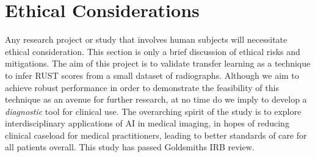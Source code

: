 




\section{Ethical Considerations}

Any research project or study that involves human subjects will necessitate ethical consideration. This section is only a brief discussion of ethical risks and mitigations. The aim of this project is to validate transfer learning as a technique to infer RUST scores from a small dataset of radiographs. Although we aim to achieve robust performance in order to demonstrate the feasibility of this technique as an avenue for further research, at no time do we imply to develop a \emph{diagnostic} tool for clinical use. The overarching spirit of the study is to explore interdisciplinary applications of AI in medical imaging, in hopes of reducing clinical caseload for medical practitioners, leading to better standards of care for all patients overall. This study has passed Goldsmiths IRB review.


